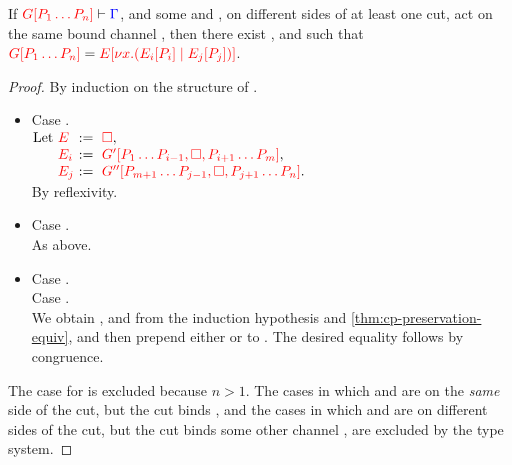 \begin{lemmaB}\label{thm:cp-progress-beta}
  If $\seq[{ \cpPlug{G}{P_1 \dots P_n} }]{ \Gamma }$, and some  and
  , on different sides of at least one cut, act on the same bound
  channel , then there exist ,  and  such that 
  \(
  \tm{\cpPlug{G}{P_1 \dots P_n}} =
  \tm{\cpPlug{E}{\cpCut{x}{\cpPlug{E_i}{P_i}}{\cpPlug{E_j}{P_j}}}}
  \).
\end{lemmaB}
\begin{proof}
  By induction on the structure of .
  \begin{itemize}
  \item
    Case . 
    \\
    \(\arraycolsep=0pt\begin{array}[t]{lll}
      \text{Let}&\ \tm{E}  &\ :=\ \tm{\Box}, \\
                &\ \tm{E_i}&\ :=\ \tm{\cpPlug{G'}{P_1\dots P_{i-1},\Box,P_{i+1}\dots P_m}}, \\
                &\ \tm{E_j}&\ :=\ \tm{\cpPlug{G''}{P_{m+1}\dots P_{j-1},\Box,P_{j+1}\dots P_n}}.
    \end{array}\)
    \\[1ex]
    By reflexivity.
  \item
    Case .
    \\
    As above.
  \item
    Case . \\
    Case .
    \\
    We obtain ,  and  from the induction hypothesis and
    \cref{thm:cp-preservation-equiv}, and then prepend either
     or
     to .
    The desired equality follows by congruence.
  \end{itemize}
  The case for \tm{\Box} is excluded because $n > 1$.
  The cases in which  and  are on the \emph{same} side of the
  cut, but the cut binds , and the cases in which  and 
  are on different sides of the cut, but the cut binds some other channel
  , are excluded by the type system.
\end{proof}
